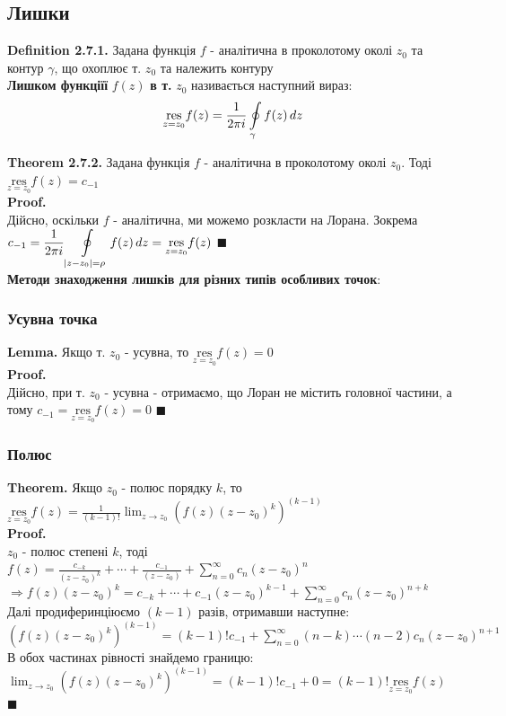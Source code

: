 \documentclass[a4paper, 14pt]{extarticle}
\def\residue#1#2{\underset{z = {#1}}{\textrm{res}} {#2}}
\def\hugespace{\vspace{5mm} \\}
\begin{document}
\subsection{Лишки}
\textbf{Definition 2.7.1.} Задана функція $f$ - аналітична в проколотому околі $z_0$ та контур $\gamma$, що охоплює т. $z_0$ та належить контуру\\
\textbf{Лишком функціїї} $f(z)$ \textbf{в т.} $z_0$ називається наступний вираз:
\begin{align*}
 \underset{z = z_0}{\textrm{res}} f(z) = \frac{1}{2 \pi i} \oint\displaylimits_{\gamma} f(z) \,dz
\end{align*}

\textbf{Theorem 2.7.2.} Задана функція $f$ - аналітична в проколотому околі $z_0$. Тоді $\displaystyle \residue{z_0}{f(z)} = c_{-1}$\\
\textbf{Proof.}\\
Дійсно, оскільки $f$ - аналітична, ми можемо розкласти на Лорана. Зокрема $\displaystyle c_{-1} = \frac{1}{2 \pi i} \oint\displaylimits_{|z-z_0|=\rho} f(z) \,dz = \residue{z_0}{f(z)}$ $\blacksquare$
\hugespace
\textbf{Методи знаходження лишків для різних типів особливих точок}:
\subsubsection{Усувна точка}
\textbf{Lemma.} Якщо т. $z_0$ - усувна, то $\residue{z_0}{f(z)} = 0$\\
\textbf{Proof.}\\
Дійсно, при т. $z_0$ - усувна - отримаємо, що Лоран не містить головної частини, а тому $c_{-1}=\residue{z_0}{f(z)} = 0$ $\blacksquare$
\hugespace

\subsubsection{Полюс}
\textbf{Theorem.} Якщо $z_0$ - полюс порядку $k$, то \\$\displaystyle \residue{z_0}{f(z)} = \frac{1}{(k-1)!} \lim_{z \to z_0} (f(z)(z-z_0)^k)^{(k-1)}$\\
\textbf{Proof.}\\
$z_0$ - полюс степені $k$, тоді\\
$\displaystyle f(z) = \frac{c_{-k}}{(z-z_0)^k} + \cdots + \frac{c_{-1}}{(z-z_0)} + \sum_{n=0}^{\infty} c_n(z-z_0)^n$\\
$\displaystyle \Rightarrow f(z)(z-z_0)^k = c_{-k} + \cdots + c_{-1}(z-z_0)^{k-1} + \sum_{n=0}^{\infty} c_n(z-z_0)^{n+k}$\\
Далі продиферинціюємо $(k-1)$ разів, отримавши наступне:\\
$\displaystyle (f(z)(z-z_0)^k)^{(k-1)} = (k-1)!c_{-1} + \sum_{n=0}^{\infty} (n-k)\cdots(n-2)c_n(z-z_0)^{n+1}$\\
В обох частинах рівності знайдемо границю:\\
$\displaystyle \lim_{z \to z_0} (f(z)(z-z_0)^k)^{(k-1)} = (k-1)!c_{-1}+0 = (k-1)! \residue{z_0}{f(z)}$ $\blacksquare$
\hugespace
\end{document}
